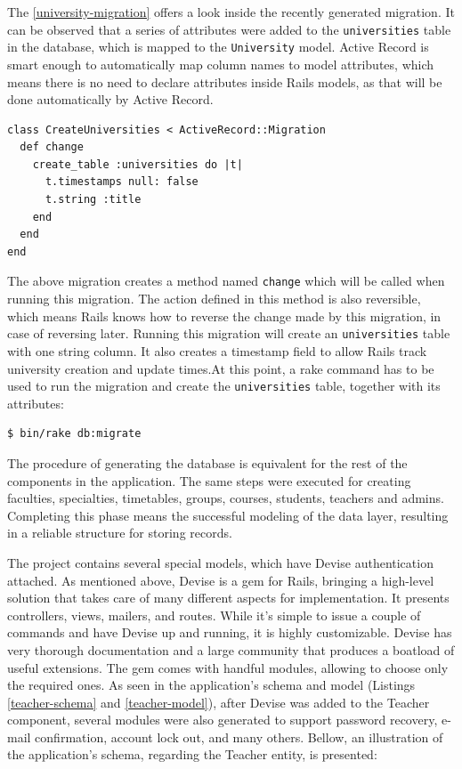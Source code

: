 The \autoref{university-migration} offers a look inside the recently generated migration. It can be observed that a series of attributes were added to the \texttt{universities} table in the database, which is mapped to the \texttt{University} model. Active Record is smart enough to automatically map column names to model attributes, which means there is no need to declare attributes inside Rails models, as that will be done automatically by Active Record.

\begin{lstlisting}[caption={Migration for Creating University},label={university-migration}]
class CreateUniversities < ActiveRecord::Migration
  def change
    create_table :universities do |t|
      t.timestamps null: false
      t.string :title
    end
  end
end
\end{lstlisting}
\bigskip
 
The above migration creates a method named \texttt{change} which will be called when running this migration. The action defined in this method is also reversible, which means Rails knows how to reverse the change made by this migration, in case of reversing later. Running this migration will create an \texttt{universities} table with one string column. It also creates a timestamp field to allow Rails track university creation and update times.At this point, a rake command has to be used to run the migration and create the \texttt{universities} table, together with its attributes:

\begin{lstlisting}[style=nonumbers, caption={Add University table in the Database},label={migrate-university}]
$ bin/rake db:migrate
\end{lstlisting}
\bigskip

The procedure of generating the database is equivalent for the rest of the components in the application. The same steps were executed for creating faculties, specialties, timetables, groups, courses, students, teachers and admins. Completing this phase means the successful modeling of the data layer, resulting in a reliable structure for storing records.

The project contains several special models, which have Devise authentication attached. As mentioned above, Devise is a gem for Rails, bringing a high-level solution that takes care of many different aspects for implementation. It presents controllers, views, mailers, and routes. While it's simple to issue a couple of commands and have Devise up and running, it is highly customizable. Devise has very thorough documentation and a large community that produces a boatload of useful extensions. The gem comes with handful modules, allowing to choose only the required ones. As seen in the application's schema and model (Listings \ref{teacher-schema} and \ref{teacher-model}), after Devise was added to the Teacher component,  several modules were also generated to support password recovery, e-mail confirmation, account lock out, and many others. Bellow, an illustration of the application's schema, regarding the Teacher entity, is presented:

